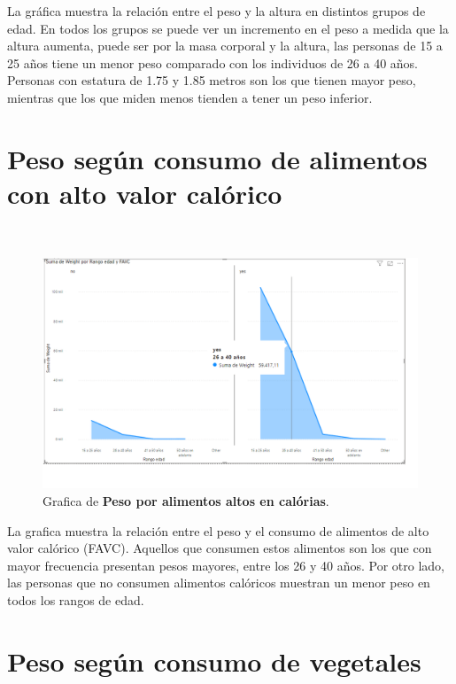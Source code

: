 \documentclass[a4paper]{report} %
\begin{document}
La gráfica muestra la relación entre el peso y la altura en distintos grupos de edad. En todos los grupos se puede ver un incremento en el peso a medida que la altura aumenta, puede ser por la masa corporal y la altura, las personas de 15 a 25 años tiene un menor peso comparado con los individuos de 26 a  40 años. Personas con estatura de 1.75 y 1.85 metros son los que tienen mayor peso, mientras que los que miden menos tienden a tener un peso inferior.
            \section{Peso según consumo de alimentos con alto valor calórico}
              \paragraph{}\mbox{} \\

\begin{figure}[htb]
                \centering
                  \includegraphics[width=\textwidth]{Images/pesoporalimentoscalorias.png}
                  \caption{Grafica de \textbf{Peso por alimentos altos en calórias}.}
              \end{figure} 

              La grafica muestra la relación entre el peso y el consumo de alimentos de alto valor calórico (FAVC). Aquellos que consumen estos alimentos son los que con mayor frecuencia presentan pesos mayores, entre los 26 y 40 años. Por otro lado, las personas que no consumen alimentos calóricos muestran un menor peso en todos los rangos de edad.
        \section{Peso según consumo de vegetales}
\end{document}
